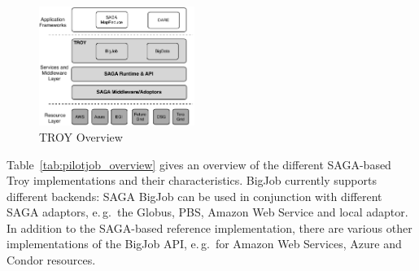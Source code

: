 \documentclass[conference,final]{IEEEtran}
\begin{document}
\begin{figure}[htbp]
	\centering
		\includegraphics[width=0.45\textwidth]{figures/troy.pdf}
	\caption{TROY Overview}
	\label{fig:figures_troy}
\end{figure}


Table~\ref{tab:pilotjob_overview} gives an overview of the different SAGA-based 
Troy implementations and their characteristics. BigJob currently
supports different backends: SAGA BigJob can be used in conjunction
with different SAGA adaptors, e.\,g.\ the Globus, PBS, Amazon Web
Service and local adaptor. In addition to the SAGA-based reference
implementation, there are various other implementations of the BigJob
API, e.\,g.\ for Amazon Web Services, Azure and Condor resources.
\end{document}
